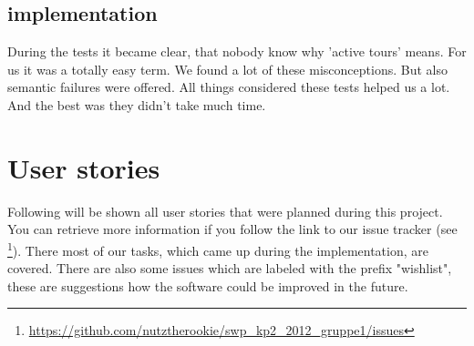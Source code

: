 \clearpage

\subsection{implementation}

During the tests it became clear, that nobody know why 'active tours' means. For us it was a totally easy term. We found a lot of
these misconceptions. But also semantic failures were offered. All things considered these tests helped us a lot. And the best was
they didn't take much time.

\section{User stories}\label{sec:US}
Following will be shown all user stories that were planned during this project.
You can retrieve more information if you follow the link to our issue tracker (see
\footnote{\url{https://github.com/nutztherookie/swp_kp2_2012_gruppe1/issues}}). There most of our tasks, which came up during the
implementation, are covered. There are also some issues which are labeled with the prefix "wishlist", these are suggestions how
the software could be improved in the future.


